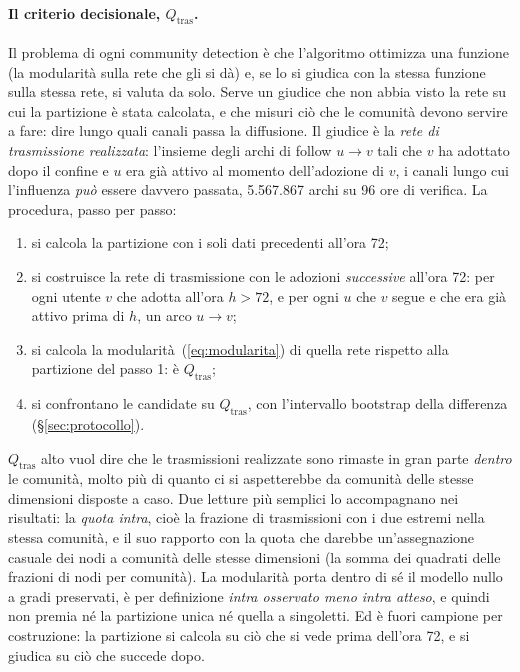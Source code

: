 \documentclass[11pt,a4paper]{article}
\newcommand{\Qtras}{Q_{\mathrm{tras}}}
\begin{document}
\paragraph{Il criterio decisionale, $\Qtras$.} Il problema di ogni community detection è che l'algoritmo ottimizza una funzione (la modularità sulla rete che gli si dà) e, se lo si giudica con la stessa funzione sulla stessa rete, si valuta da solo. Serve un giudice che non abbia visto la rete su cui la partizione è stata calcolata, e che misuri ciò che le comunità devono servire a fare: dire lungo quali canali passa la diffusione. Il giudice è la \emph{rete di trasmissione realizzata}: l'insieme degli archi di follow $u \to v$ tali che $v$ ha adottato dopo il confine e $u$ era già attivo al momento dell'adozione di $v$, i canali lungo cui l'influenza \emph{può} essere davvero passata, 5.567.867 archi su 96 ore di verifica. La procedura, passo per passo:
\begin{enumerate}
  \item si calcola la partizione con i soli dati precedenti all'ora 72;
  \item si costruisce la rete di trasmissione con le adozioni \emph{successive} all'ora 72: per ogni utente $v$ che adotta all'ora $h > 72$, e per ogni $u$ che $v$ segue e che era già attivo prima di $h$, un arco $u \to v$;
  \item si calcola la modularità~(\ref{eq:modularita}) di quella rete rispetto alla partizione del passo 1: è $\Qtras$;
  \item si confrontano le candidate su $\Qtras$, con l'intervallo bootstrap della differenza (\S\ref{sec:protocollo}).
\end{enumerate}
$\Qtras$ alto vuol dire che le trasmissioni realizzate sono rimaste in gran parte \emph{dentro} le comunità, molto più di quanto ci si aspetterebbe da comunità delle stesse dimensioni disposte a caso. Due letture più semplici lo accompagnano nei risultati: la \emph{quota intra}, cioè la frazione di trasmissioni con i due estremi nella stessa comunità, e il suo rapporto con la quota che darebbe un'assegnazione casuale dei nodi a comunità delle stesse dimensioni (la somma dei quadrati delle frazioni di nodi per comunità). La modularità porta dentro di sé il modello nullo a gradi preservati, è per definizione \emph{intra osservato meno intra atteso}, e quindi non premia né la partizione unica né quella a singoletti. Ed è fuori campione per costruzione: la partizione si calcola su ciò che si vede prima dell'ora 72, e si giudica su ciò che succede dopo.
\end{document}
